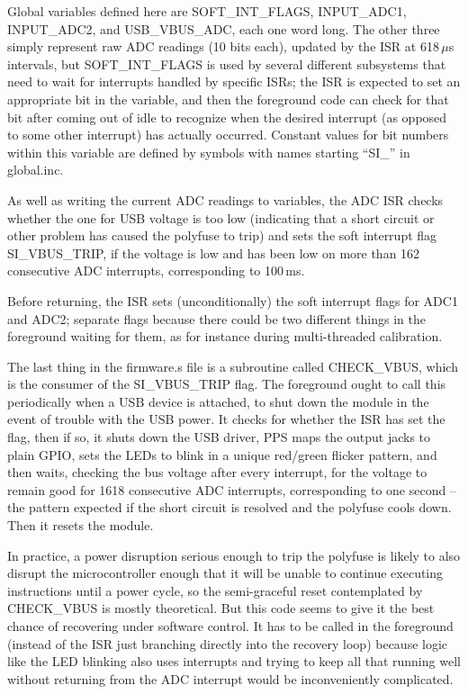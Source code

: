 Global variables defined here are SOFT\_INT\_FLAGS, INPUT\_ADC1, INPUT\_ADC2,
and USB\_VBUS\_ADC, each one word long.  The other three simply represent
raw ADC readings (10 bits each), updated by the ISR at 618\,$\mu$s
intervals, but SOFT\_INT\_FLAGS is used by several different subsystems that
need to wait for interrupts handled by specific ISRs; the ISR is expected to
set an appropriate bit in the variable, and then the foreground code can
check for that bit after coming out of idle to recognize when the desired
interrupt (as opposed to some other interrupt) has actually occurred. 
Constant values for bit numbers within this variable are defined by
symbols with names starting ``SI\_'' in global.inc.

As well as writing the current ADC readings to variables, the ADC ISR checks
whether the one for USB voltage is too low (indicating that a short circuit
or other problem has caused the polyfuse to trip) and sets the soft
interrupt flag SI\_VBUS\_TRIP, if the voltage is low and has been low
on more than 162 consecutive ADC interrupts, corresponding to 100\,ms.

Before returning, the ISR sets (unconditionally) the soft interrupt flags
for ADC1 and ADC2; separate flags because there could be two different
things in the foreground waiting for them, as for instance during
multi-threaded calibration.

The last thing in the firmware.s file is a subroutine called CHECK\_VBUS,
which is the consumer of the SI\_VBUS\_TRIP flag.  The foreground ought to
call this periodically when a USB device is attached, to shut down the
module in the event of trouble with the USB power.  It checks for whether
the ISR has set the flag, then if so, it shuts down the USB driver, PPS
maps the output jacks to plain GPIO, sets the LEDs to blink in a unique
red/green flicker pattern, and then waits, checking the bus voltage after
every interrupt, for the voltage to remain good for 1618 consecutive ADC
interrupts, corresponding to one second -- the pattern expected if the short
circuit is resolved and the polyfuse cools down.  Then it resets the module.

In practice, a power disruption serious enough to trip the polyfuse is
likely to also disrupt the microcontroller enough that it will be unable to
continue executing instructions until a power cycle, so the semi-graceful
reset contemplated by CHECK\_VBUS is mostly theoretical.  But this code
seems to give it the best chance of recovering under software control.  It
has to be called in the foreground (instead of the ISR just branching
directly into the recovery loop) because logic like the LED blinking also
uses interrupts and trying to keep all that running well without returning
from the ADC interrupt would be inconveniently complicated.

